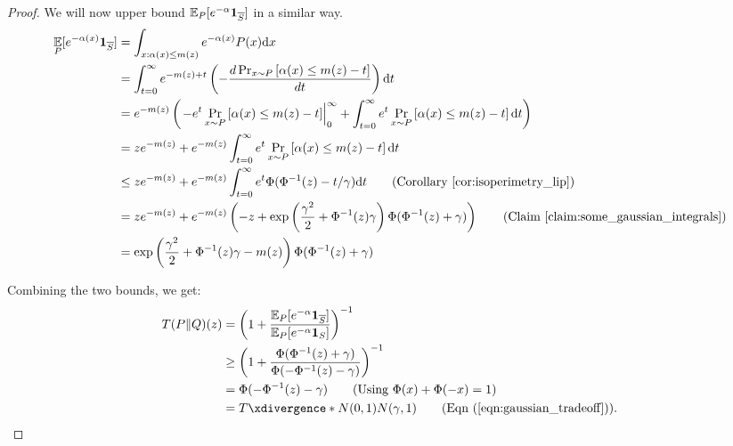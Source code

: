 \begin{proof}



We will now upper bound $\operatorname*{\mathbb{E}}_P[e^{-\alpha}\mathbf{1}_{\overline{S}}]$ in a similar way.
\begin{align*}
\E_P[e^{-\alpha(x)}\Ind_{\barS}]&=\int_{x: \alpha(x)\le m(z)}e^{-\alpha(x)}P(x) \d x\\
&= \int_{t=0}^{\infty} e^{-m(z)+t} \lp -\frac{d\Pr_{x\sim P}\lb\alpha(x)\le m(z)-t\rb}{dt}\rp \d t\\
&=  e^{-m(z)}\lp\left.-e^{t}\Pr_{x\sim P}\lb\alpha(x)\le m(z)-t\rb\right\vert_{0}^\infty + \int_{t=0}^\infty e^{t} \Pr_{x\sim P}\lb\alpha(x)\le m(z)-t\rb \d t \rp\\
&=  ze^{-m(z)} + e^{-m(z)}\int_{t=0}^\infty e^{t} \Pr_{x\sim P}\lb\alpha(x)\le m(z)-t\rb \d t\\
&\le ze^{-m(z)} + e^{-m(z)}\int_{t=0}^\infty e^{t} \Phi(\Phi^{-1}(z)-t/\gamma) \d t \tag{Corollary~\ref{cor:isoperimetry_lip}}\\
    &= ze^{-m(z)} + e^{-m(z)}\lp -z + \exp\lp\frac{\gamma^2}{2}+\Phi^{-1}(z)\gamma\rp \Phi(\Phi^{-1}(z)+\gamma) \rp \tag{Claim~\ref{claim:some_gaussian_integrals}}\\
    &= \exp\lp\frac{\gamma^2}{2}+\Phi^{-1}(z)\gamma-m(z)\rp \Phi(\Phi^{-1}(z)+\gamma)
\end{align*}


Combining the two bounds, we get:
\begin{align*}
T(P\|Q)(z)&= \lp 1+\frac{\E_P[e^{-\alpha}\Ind_{\barS}]}{\E_P[e^{-\alpha}\Ind_S]}\rp^{-1}\\
&\ge \lp 1 + \frac{\Phi(\Phi^{-1}(z)+\gamma)}{\Phi(-\Phi^{-1}(z)-\gamma)} \rp^{-1}\\
&= \Phi(-\Phi^{-1}(z)-\gamma) \tag{Using $\Phi(x)+\Phi(-x)=1$}\\
&= \tradeoff{N(0,1)}{N(\gamma,1)} \tag{Eqn (\ref{eqn:gaussian_tradeoff})}.
\end{align*}
\end{proof}

